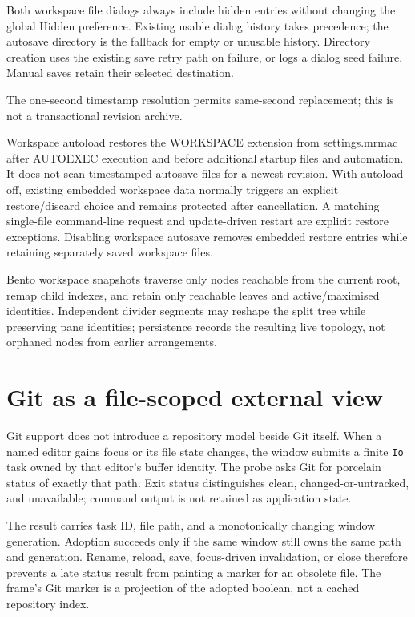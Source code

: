 \documentclass[a4paper,10pt,twoside,openany]{book}
\begin{document}
Both workspace file dialogs always include hidden entries without changing
the global Hidden preference. Existing usable dialog history takes precedence;
the autosave directory is the fallback for empty or unusable history. Directory
creation uses the existing save retry path on failure, or logs a dialog seed
failure. Manual saves retain their selected destination.

The one-second timestamp resolution permits same-second replacement; this is
not a transactional revision archive.

Workspace autoload restores the WORKSPACE extension from settings.mrmac after
AUTOEXEC execution and before additional startup files and automation. It does
not scan timestamped autosave files for a newest revision. With autoload off,
existing embedded workspace data normally triggers an explicit restore/discard
choice and remains protected after cancellation. A matching single-file
command-line request and update-driven restart are explicit restore exceptions.
Disabling workspace autosave removes embedded restore entries while retaining
separately saved workspace files.

Bento workspace snapshots traverse only nodes reachable from the current root,
remap child indexes, and retain only reachable leaves and active/maximised
identities. Independent divider segments may reshape the split tree while
preserving pane identities; persistence records the resulting live topology,
not orphaned nodes from earlier arrangements.
\chapter{Git as a file-scoped external view}

Git support does not introduce a repository model beside Git itself. When a
named editor gains focus or its file state changes, the window submits a
finite \texttt{Io} task owned by that editor's buffer identity. The probe asks
Git for porcelain status of exactly that path. Exit status distinguishes
clean, changed-or-untracked, and unavailable; command output is not retained
as application state.

The result carries task ID, file path, and a monotonically changing window
generation. Adoption succeeds only if the same window still owns the same
path and generation. Rename, reload, save, focus-driven invalidation, or close
therefore prevents a late status result from painting a marker for an obsolete
file. The frame's Git marker is a projection of the adopted boolean, not a
cached repository index.
\end{document}
